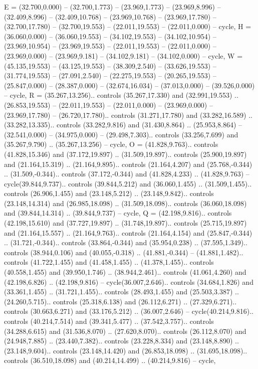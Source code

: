 {E} = {(32.700,0.000) -- (32.700,1.773) -- (23.969,1.773) -- (23.969,8.996) -- (32.409,8.996) -- (32.409,10.768) -- (23.969,10.768) -- (23.969,17.780) -- (32.700,17.780) -- (32.700,19.553) -- (22.011,19.553) -- (22.011,0.000) -- cycle},
{H} = {(36.060,0.000) -- (36.060,19.553) -- (34.102,19.553) -- (34.102,10.954) -- (23.969,10.954) -- (23.969,19.553) -- (22.011,19.553) -- (22.011,0.000) -- (23.969,0.000) -- (23.969,9.181) -- (34.102,9.181) -- (34.102,0.000) -- cycle},
{W} = {(45.135,19.553) -- (43.125,19.553) -- (38.309,2.540) -- (33.626,19.553) -- (31.774,19.553) -- (27.091,2.540) -- (22.275,19.553) -- (20.265,19.553) -- (25.847,0.000) -- (28.387,0.000) -- (32.674,16.034) -- (37.013,0.000) -- (39.526,0.000) -- cycle},
{R} = {(35.267,13.256).. controls (35.267,17.330) and (32.991,19.553) .. (26.853,19.553) -- (22.011,19.553) -- (22.011,0.000) -- (23.969,0.000) -- (23.969,17.780) -- (26.720,17.780).. controls (31.271,17.780) and (33.282,16.589) .. (33.282,13.335).. controls (33.282,9.816) and (31.430,8.864) .. (25.953,8.864) -- (32.541,0.000) -- (34.975,0.000) -- (29.498,7.303).. controls (33.256,7.699) and (35.267,9.790) .. (35.267,13.256) -- cycle},
{O} = {(41.828,9.763).. controls (41.828,15.346) and (37.172,19.897) .. (31.509,19.897).. controls (25.900,19.897) and (21.164,15.319) .. (21.164,9.895).. controls (21.164,4.207) and (25.768,-0.344) .. (31.509,-0.344).. controls (37.172,-0.344) and (41.828,4.233) .. (41.828,9.763) -- cycle(39.844,9.737).. controls (39.844,5.212) and (36.060,1.455) .. (31.509,1.455).. controls (26.906,1.455) and (23.148,5.212) .. (23.148,9.842).. controls (23.148,14.314) and (26.985,18.098) .. (31.509,18.098).. controls (36.060,18.098) and (39.844,14.314) .. (39.844,9.737) -- cycle},
{Q} = {(42.198,9.816).. controls (42.198,15.610) and (37.727,19.897) .. (31.748,19.897).. controls (25.715,19.897) and (21.164,15.557) .. (21.164,9.763).. controls (21.164,4.154) and (25.847,-0.344) .. (31.721,-0.344).. controls (33.864,-0.344) and (35.954,0.238) .. (37.595,1.349).. controls (38.944,0.106) and (40.055,-0.318) .. (41.881,-0.344) -- (41.881,1.482).. controls (41.722,1.455) and (41.458,1.455) .. (41.378,1.455).. controls (40.558,1.455) and (39.950,1.746) .. (38.944,2.461).. controls (41.061,4.260) and (42.198,6.826) .. (42.198,9.816) -- cycle(36.007,2.646).. controls (34.684,1.826) and (33.361,1.455) .. (31.721,1.455).. controls (28.493,1.455) and (25.503,3.387) .. (24.260,5.715).. controls (25.318,6.138) and (26.112,6.271) .. (27.329,6.271).. controls (30.663,6.271) and (33.176,5.212) .. (36.007,2.646) -- cycle(40.214,9.816).. controls (40.214,7.514) and (39.341,5.477) .. (37.542,3.757).. controls (34.288,6.615) and (31.536,8.070) .. (27.620,8.070).. controls (26.112,8.070) and (24.948,7.885) .. (23.440,7.382).. controls (23.228,8.334) and (23.148,8.890) .. (23.148,9.604).. controls (23.148,14.420) and (26.853,18.098) .. (31.695,18.098).. controls (36.510,18.098) and (40.214,14.499) .. (40.214,9.816) -- cycle},
